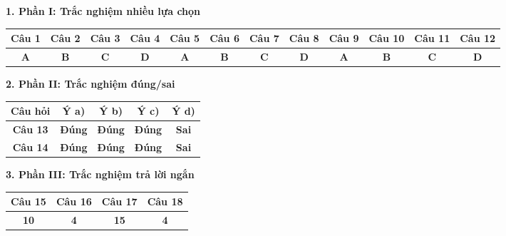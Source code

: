 \documentclass[12pt,a4paper]{article}
\begin{document}
\vspace{0.2cm}
\textbf{1. Phần I: Trắc nghiệm nhiều lựa chọn}
\begin{center}
{\setlength{\tabcolsep}{2.5pt}\small
\begin{tabular}{|c|c|c|c|c|c|c|c|c|c|c|c|}
\hline
\textbf{Câu 1} & \textbf{Câu 2} & \textbf{Câu 3} & \textbf{Câu 4} & \textbf{Câu 5} & \textbf{Câu 6} & \textbf{Câu 7} & \textbf{Câu 8} & \textbf{Câu 9} & \textbf{Câu 10} & \textbf{Câu 11} & \textbf{Câu 12} \\
\hline
\textbf{A} & \textbf{B} & \textbf{C} & \textbf{D} & \textbf{A} & \textbf{B} & \textbf{C} & \textbf{D} & \textbf{A} & \textbf{B} & \textbf{C} & \textbf{D} \\
\hline
\end{tabular}}
\end{center}

\vspace{0.2cm}
\textbf{2. Phần II: Trắc nghiệm đúng/sai}
\begin{center}
\begin{tabular}{|c|c|c|c|c|}
\hline
\textbf{Câu hỏi} & \textbf{Ý a)} & \textbf{Ý b)} & \textbf{Ý c)} & \textbf{Ý d)} \\
\hline
\textbf{Câu 13} & \textbf{Đúng} & \textbf{Đúng} & \textbf{Đúng} & \textbf{Sai} \\
\hline
\textbf{Câu 14} & \textbf{Đúng} & \textbf{Đúng} & \textbf{Đúng} & \textbf{Sai} \\
\hline
\end{tabular}
\end{center}

\vspace{0.2cm}
\textbf{3. Phần III: Trắc nghiệm trả lời ngắn}
\begin{center}
\begin{tabular}{|c|c|c|c|}
\hline
\textbf{Câu 15} & \textbf{Câu 16} & \textbf{Câu 17} & \textbf{Câu 18} \\
\hline
\textbf{10} & \textbf{4} & \textbf{15} & \textbf{4} \\
\hline
\end{tabular}
\end{center}
\end{document}
